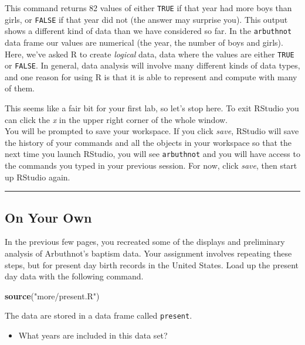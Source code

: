 \documentclass[]{article}
\newenvironment{Shaded}{\begin{snugshade}}{\end{snugshade}}
\newcommand{\KeywordTok}[1]{\textcolor[rgb]{0.13,0.29,0.53}{\textbf{#1}}}
\newcommand{\StringTok}[1]{\textcolor[rgb]{0.31,0.60,0.02}{#1}}
\newcommand{\NormalTok}[1]{#1}
\providecommand{\tightlist}{%
  \setlength{\itemsep}{0pt}\setlength{\parskip}{0pt}}
\begin{document}
This command returns 82 values of either \texttt{TRUE} if that year had
more boys than girls, or \texttt{FALSE} if that year did not (the answer
may surprise you). This output shows a different kind of data than we
have considered so far. In the \texttt{arbuthnot} data frame our values
are numerical (the year, the number of boys and girls). Here, we've
asked R to create \emph{logical} data, data where the values are either
\texttt{TRUE} or \texttt{FALSE}. In general, data analysis will involve
many different kinds of data types, and one reason for using R is that
it is able to represent and compute with many of them.

This seems like a fair bit for your first lab, so let's stop here. To
exit RStudio you can click the \emph{x} in the upper right corner of the
whole window.\\
You will be prompted to save your workspace. If you click \emph{save},
RStudio will save the history of your commands and all the objects in
your workspace so that the next time you launch RStudio, you will see
\texttt{arbuthnot} and you will have access to the commands you typed in
your previous session. For now, click \emph{save}, then start up RStudio
again.

\begin{center}\rule{0.5\linewidth}{\linethickness}\end{center}

\subsection{On Your Own}\label{on-your-own}

In the previous few pages, you recreated some of the displays and
preliminary analysis of Arbuthnot's baptism data. Your assignment
involves repeating these steps, but for present day birth records in the
United States. Load up the present day data with the following command.

\begin{Shaded}
\begin{Highlighting}[]
\KeywordTok{source}\NormalTok{(}\StringTok{"more/present.R"}\NormalTok{)}
\end{Highlighting}
\end{Shaded}

The data are stored in a data frame called \texttt{present}.

\begin{itemize}
\tightlist
\item
  What years are included in this data set?
\end{itemize}
\end{document}
